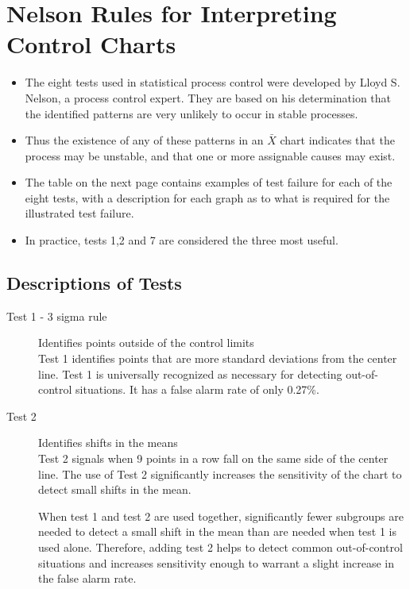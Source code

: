 \documentclass[]{report}
\begin{document}
\section{Nelson Rules for Interpreting Control Charts}
{\large
	\begin{itemize}
		\item The eight tests used in statistical process control were developed by Lloyd S. Nelson, a process control expert. They are
		based on his determination that the identified patterns are very unlikely to occur in stable processes.
		
		\item Thus
		the existence of any of these patterns in an $\bar{X}$ chart indicates that the process may be unstable, and that one or
		more assignable causes may exist. 
		
		\item The table on the next page contains examples of test failure for each of the eight tests,
		with a description for each graph as to what is required for the illustrated test failure.
		
		\item In practice, tests 1,2 and 7 are considered the three most useful.
	\end{itemize}
}
{
	\large
	\subsection{Descriptions of Tests}
	\begin{description}
		\item[Test 1 - 3 sigma rule] Identifies points outside of the control limits\\
		Test 1 identifies points that are more standard deviations from the center line. Test 1 is
		universally recognized as necessary for detecting out-of-control situations. It has a
		false alarm rate of only 0.27\%.
		
		\item[Test 2] Identifies shifts in the means \\
		Test 2 signals when 9 points in a row fall on the same side of the center line.  The use of Test 2
		significantly increases the sensitivity of the chart to detect small shifts in the mean.
		
		When test 1 and test 2 are used together, significantly fewer subgroups are needed
		to detect a small shift in the mean than are needed when test 1 is used alone.
		Therefore, adding test 2 helps to detect common out-of-control situations and
		increases sensitivity enough to warrant a slight increase in the false alarm rate.
	\end{description}
}
\end{document}
